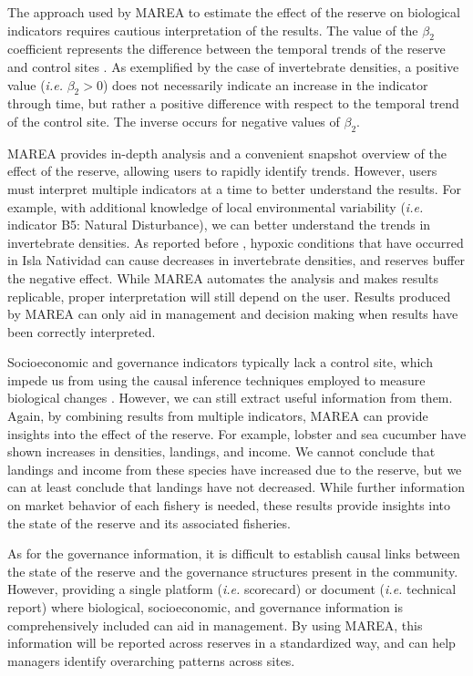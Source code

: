 \documentclass[10pt,letterpaper]{article}
\begin{document}
The approach used by MAREA to estimate the effect of the reserve on biological indicators requires cautious interpretation of the results. The value of the \(\beta_2\) coefficient represents the difference between the temporal trends of the reserve and control sites \cite{moland_2013-VP}. As exemplified by the case of invertebrate densities, a positive value (\emph{i.e.} \(\beta_2 > 0\)) does not necessarily indicate an increase in the indicator through time, but rather a positive difference with respect to the temporal trend of the control site. The inverse occurs for negative values of \(\beta_2\).

MAREA provides in-depth analysis and a convenient snapshot overview of the effect of the reserve, allowing users to rapidly identify trends. However, users must interpret multiple indicators at a time to better understand the results. For example, with additional knowledge of local environmental variability (\emph{i.e.} indicator B5: Natural Disturbance), we can better understand the trends in invertebrate densities. As reported before \cite{micheli_2012-EU}, hypoxic conditions that have occurred in Isla Natividad can cause decreases in invertebrate densities, and reserves buffer the negative effect. While MAREA automates the analysis and makes results replicable, proper interpretation will still depend on the user. Results produced by MAREA can only aid in management and decision making when results have been correctly interpreted.

Socioeconomic and governance indicators typically lack a control site, which impede us from using the causal inference techniques employed to measure biological changes \cite{mascia_2017-m_}. However, we can still extract useful information from them. Again, by combining results from multiple indicators, MAREA can provide insights into the effect of the reserve. For example, lobster and sea cucumber have shown increases in densities, landings, and income. We cannot conclude that landings and income from these species have increased due to the reserve, but we can at least conclude that landings have not decreased. While further information on market behavior of each fishery is needed, these results provide insights into the state of the reserve and its associated fisheries.

As for the governance information, it is difficult to establish causal links between the state of the reserve and the governance structures present in the community. However, providing a single platform (\emph{i.e.} scorecard) or document (\emph{i.e.} technical report) where biological, socioeconomic, and governance information is comprehensively included can aid in management. By using MAREA, this information will be reported across reserves in a standardized way, and can help managers identify overarching patterns across sites.
\end{document}

